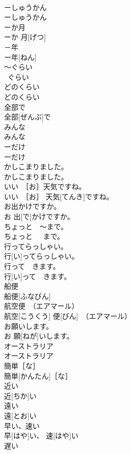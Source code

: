 \documentclass[8pt]{extreport}
\begin{document}
\begin{CJK}{UTF8}{min}
\\	ーしゅうかん	
\\	ーしゅうかん	
\\	ーか月	
\\	ーか 月[げつ]	
\\	－年	
\\	ー年[ねん]	
\\	～ぐらい	
\\	~ぐらい	
\\	どのくらい	
\\	どのくらい	
\\	全部で	
\\	全部[ぜんぶ]で	
\\	みんな	
\\	みんな	
\\	ーだけ	
\\	ーだけ	
\\	かしこまりました。	
\\	かしこまりました。	
\\	いい　［お］天気ですね。	
\\	いい　［お］ 天気[てんき]ですね。	
\\	お出かけですか。	
\\	お 出[で]かけですか。	
\\	ちょっと　～まで。	
\\	ちょっと　~まで。	
\\	行ってらっしゃい。	
\\	行[い]ってらっしゃい。	
\\	行って　きます。	
\\	行[い]って　きます。	
\\	船便	
\\	船便[ふなびん]	
\\	航空便　（エアマール）	
\\	航空[こうくう] 便[びん]　（エアマール）	
\\	お願いします。	
\\	お 願[ねが]いします。	
\\	オーストラリア	
\\	オーストラリア	
\\	簡単［な］	
\\	簡単[かんたん]［な］	
\\	近い	
\\	近[ちか]い	
\\	遠い	
\\	遠[とお]い	
\\	早い、速い	
\\	早[はや]い、 速[はや]い	
\\	遅い	

\end{CJK}
\end{document}

